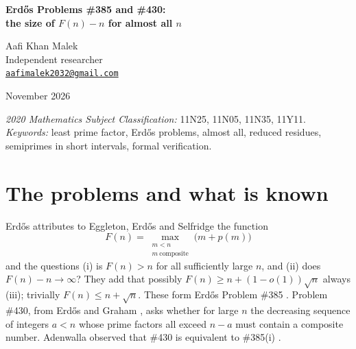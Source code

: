 \documentclass[11pt,letterpaper]{article}
\theoremstyle{remark}
\begin{document}
\begin{center}
{\Large\bfseries Erd\H{o}s Problems \#385 and \#430:\\ the size of $F(n)-n$ for almost all $n$\par}
\medskip
Aafi Khan Malek\\
Independent researcher\\
\href{mailto:aafimalek2032@gmail.com}{\texttt{aafimalek2032@gmail.com}}\par
{} November 2026
\end{center}

\begin{abstract}
Let $F(n)=\max\{m+p(m): m<n,\ m \text{ composite}\}$, where $p(m)$ is the least
prime factor of $m$. Erd\H{o}s, Eggleton and Selfridge asked whether $F(n)>n$
for all large $n$ and whether $F(n)-n\to\infty$; Erd\H{o}s Problem \#430 is
equivalent to the first question. Both questions remain open. We prove that if
$T(X)=o(\log X)$, then $F(n)>n+T(X)$ for all but $o(X)$ integers $n<X$. This
result, the elementary reductions, and a variance bound for reduced residues
in intervals are formally verified in Lean~4. Using the Vinogradov--Korobov
zero-free region, we then show that $F(n)=n+(1-o(1))\sqrt n$ for almost all
$n$, which is the strongest form of the question for almost all $n$, since
$F(n)<n+\sqrt n$ always. This deduction is also checked in Lean, with three
classical analytic inputs, not yet in mathlib, taken as hypotheses. We compute $F(n)$ exactly for all $n<5\times10^{11}$ and
support a heuristic prediction for the minimum of $(F(n)-n)/\sqrt n$.
\end{abstract}

\noindent\textit{2020 Mathematics Subject Classification:} 11N25, 11N05, 11N35, 11Y11.\\
\textit{Keywords:} least prime factor, Erd\H{o}s problems, almost all,
reduced residues, semiprimes in short intervals, formal verification.

\section{The problems and what is known}

Erd\H{o}s \cite{erdos79} attributes to Eggleton, Erd\H{o}s and Selfridge the
function
\[
F(n)=\max_{\substack{m<n\\ m\ \text{composite}}} \bigl(m+p(m)\bigr)
\]
and the questions (i) is $F(n)>n$ for all sufficiently large $n$, and (ii) does
$F(n)-n\to\infty$? They add that possibly $F(n)\ge n+(1-o(1))\sqrt n$ always
(iii); trivially $F(n)\le n+\sqrt n$. These form Erd\H{o}s Problem \#385
\cite{bloom}. Problem \#430, from Erd\H{o}s and Graham \cite{erdosgraham}, asks
whether for large $n$ the decreasing sequence of integers $a<n$ whose prime
factors all exceed $n-a$ must contain a composite number. Adenwalla observed
that \#430 is equivalent to \#385(i) \cite{bloom}.
\end{document}

